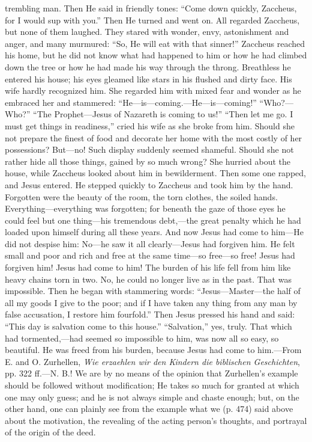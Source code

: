 trembling man. Then He said in friendly tones: “Come down quickly, Zaccheus, for I would sup with you.” Then He turned and went on. All regarded Zaccheus, but none of them laughed. They stared with wonder, envy, astonishment and anger, and many murmured: “So, He will eat with that sinner!” Zaccheus reached his home, but he did not know what had happened to him or how he had climbed down the tree or how he had made his way through the throng. Breathless he entered his house; his eyes gleamed like stars in his flushed and dirty face. His wife hardly recognized him. She regarded him with mixed fear and wonder as he embraced her and stammered: “He—is—coming.—He—is—coming!” “Who?—Who?” “The Prophet—Jesus of Nazareth is coming to us!” “Then let me go. I must get things in readiness,” cried his wife as she broke from him. Should she not prepare the finest of food and decorate her home with the most costly of her possessions? But—no! Such display suddenly seemed shameful. Should she not rather hide all those things, gained by so much wrong? She hurried about the house, while Zaccheus looked about him in bewilderment. Then some one rapped, and Jesus entered. He stepped quickly to Zaccheus and took him by the hand. Forgotten were the beauty of the room, the torn clothes, the soiled hands. Everything—everything was forgotten; for beneath the gaze of those eyes he could feel but one thing—his tremendous debt,—the great penalty which he had loaded upon himself during all these years. And now Jesus had come to him—He did not despise him: No—he saw it all clearly—Jesus had forgiven him. He felt small and poor and rich and free at the same time—so free—so free! Jesus had forgiven him! Jesus had come to him! The burden of his life fell from him like heavy chains torn in two. No, he could no longer live as in the past. That was impossible. Then he began with stammering words: “Jesus—Master—the half of all my goods I give to the poor; and if I have taken any thing from any man by false accusation, I restore him fourfold.” Then Jesus pressed his hand and said: “This day is salvation come to this house.” “Salvation,” yes, truly. That which had tormented,—had seemed so impossible to him, was now all so easy, so beautiful. He was freed from his burden, because Jesus had come to him.—From E. and O. Zurhellen, \emph{Wie erzaehlen wir den Kindern die biblischen Geschichten}, pp. 322 ff.—N. B.! We are by no means of the opinion that Zurhellen’s example should be followed without modification; He takes so much for granted at which one may only guess; and he is not always simple and chaste enough; but, on the
other hand, one can plainly see from the example what we (p. 474) said above about the motivation, the revealing of the acting person’s thoughts, and portrayal of the origin of the deed.

